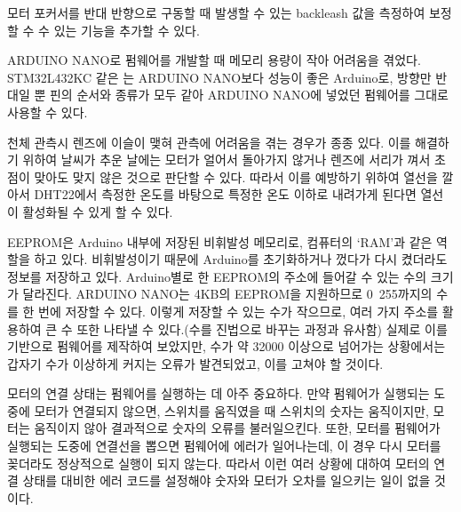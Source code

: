 \begin{description}[font=$\bullet$~\normalfont\scshape\color{red!50!black}]
	\item [backleash 보정 기능 추가] 모터 포커서를 반대 반향으로 구동할 때 발생할 수 있는 backleash 값을 측정하여 보정할 수 수 있는 기능을 추가할 수 있다.
	\item [MCU 변경] ARDUINO NANO로 펌웨어를 개발할 때 메모리 용량이 작아 어려움을 겪었다. STM32L432KC 같은 는 ARDUINO NANO보다 성능이 좋은 Arduino로, 방향만 반대일 뿐 핀의 순서와 종류가 모두 같아 ARDUINO NANO에 넣었던 펌웨어를 그대로 사용할 수 있다.
	\item [Heating system 추가] 천체 관측시 렌즈에 이슬이 맺혀 관측에 어려움을 겪는 경우가 종종 있다. 이를 해결하기 위하여 날씨가 추운 날에는 모터가 얼어서 돌아가지 않거나 렌즈에 서리가 껴서 초점이 맞아도 맞지 않은 것으로 판단할 수 있다. 따라서 이를 예방하기 위하여 열선을 깔아서 DHT22에서 측정한 온도를 바탕으로 특정한 온도 이하로 내려가게 된다면 열선이 활성화될 수 있게 할 수 있다.
	\item [EEPROM 활용] EEPROM은 Arduino 내부에 저장된 비휘발성 메모리로, 컴퓨터의 ‘RAM’과 같은 역할을 하고 있다. 비휘발성이기 때문에 Arduino를 초기화하거나 껐다가 다시 켰더라도 정보를 저장하고 있다. 
	Arduino별로 한 EEPROM의 주소에 들어갈 수 있는 수의 크기가 달라진다. ARDUINO NANO는 4KB의 EEPROM을 지원하므로 0~255까지의 수를 한 번에 저장할 수 있다. 이렇게 저장할 수 있는 수가 작으므로, 여러 가지 주소를 활용하여 큰 수 또한 나타낼 수 있다.(수를 진법으로 바꾸는 과정과 유사함) 실제로 이를 기반으로 펌웨어를 제작하여 보았지만, 수가 약 32000 이상으로 넘어가는 상황에서는 갑자기 수가 이상하게 커지는 오류가 발견되었고, 이를 고쳐야 할 것이다.
	\item [모터 연결 상태 체크 기능 추가] 모터의 연결 상태는 펌웨어를 실행하는 데 아주 중요하다. 만약 펌웨어가 실행되는 도중에 모터가 연결되지 않으면, 스위치를 움직였을 때 스위치의 숫자는 움직이지만, 모터는 움직이지 않아 결과적으로 숫자의 오류를 불러일으킨다. 또한, 모터를 펌웨어가 실행되는 도중에 연결선을 뽑으면 펌웨어에 에러가 일어나는데, 이 경우 다시 모터를 꽂더라도 정상적으로 실행이 되지 않는다. 따라서 이런 여러 상황에 대하여 모터의 연결 상태를 대비한 에러 코드를 설정해야 숫자와 모터가 오차를 일으키는 일이 없을 것이다.
\end{description}
